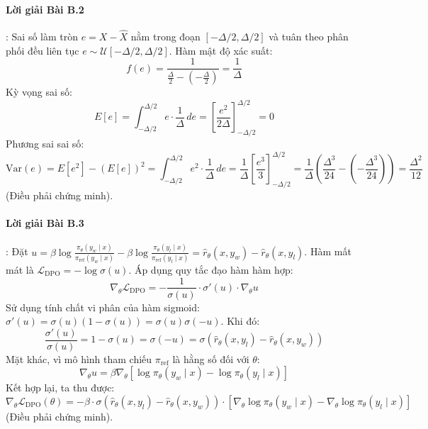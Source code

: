\paragraph{Lời giải Bài B.2}:
Sai số làm tròn $e = X - \hat{X}$ nằm trong đoạn $[-\Delta / 2, \Delta / 2]$ và tuân theo phân phối đều liên tục $e \sim \mathcal{U}[-\Delta/2, \Delta/2]$. Hàm mật độ xác suất:
\begin{equation*}
f(e) = \frac{1}{\frac{\Delta}{2} - \left(-\frac{\Delta}{2}\right)} = \frac{1}{\Delta}
\end{equation*}
Kỳ vọng sai số:
\begin{equation*}
E[e] = \int_{-\Delta/2}^{\Delta/2} e \cdot \frac{1}{\Delta} \, de = \left[ \frac{e^2}{2\Delta} \right]_{-\Delta/2}^{\Delta/2} = 0
\end{equation*}
Phương sai sai số:
\begin{equation*}
\text{Var}(e) = E[e^2] - (E[e])^2 = \int_{-\Delta/2}^{\Delta/2} e^2 \cdot \frac{1}{\Delta} \, de = \frac{1}{\Delta} \left[ \frac{e^3}{3} \right]_{-\Delta/2}^{\Delta/2} = \frac{1}{\Delta} \left( \frac{\Delta^3}{24} - \left(-\frac{\Delta^3}{24}\right) \right) = \frac{\Delta^2}{12}
\end{equation*}
(Điều phải chứng minh).

\paragraph{Lời giải Bài B.3}:
Đặt $u = \beta \log \frac{\pi_\theta(y_w \mid x)}{\pi_{\text{ref}}(y_w \mid x)} - \beta \log \frac{\pi_\theta(y_l \mid x)}{\pi_{\text{ref}}(y_l \mid x)} = \hat{r}_\theta(x, y_w) - \hat{r}_\theta(x, y_l)$.
Hàm mất mát là $\mathcal{L}_{\text{DPO}} = -\log \sigma(u)$. Áp dụng quy tắc đạo hàm hàm hợp:
\begin{equation*}
\nabla_\theta \mathcal{L}_{\text{DPO}} = -\frac{1}{\sigma(u)} \cdot \sigma'(u) \cdot \nabla_\theta u
\end{equation*}
Sử dụng tính chất vi phân của hàm sigmoid: $\sigma'(u) = \sigma(u)(1 - \sigma(u)) = \sigma(u)\sigma(-u)$. Khi đó:
\begin{equation*}
\frac{\sigma'(u)}{\sigma(u)} = 1 - \sigma(u) = \sigma(-u) = \sigma\left(\hat{r}_\theta(x, y_l) - \hat{r}_\theta(x, y_w)\right)
\end{equation*}
Mặt khác, vì mô hình tham chiếu $\pi_{\text{ref}}$ là hằng số đối với $\theta$:
\begin{equation*}
\nabla_\theta u = \beta \nabla_\theta \left[\log \pi_\theta(y_w \mid x) - \log \pi_\theta(y_l \mid x)\right]
\end{equation*}
Kết hợp lại, ta thu được:
\begin{equation*}
\nabla_\theta \mathcal{L}_{\text{DPO}}(\theta) = -\beta \cdot \sigma\left( \hat{r}_\theta(x, y_l) - \hat{r}_\theta(x, y_w) \right) \cdot \left[ \nabla_\theta \log \pi_\theta(y_w \mid x) - \nabla_\theta \log \pi_\theta(y_l \mid x) \right]
\end{equation*}
(Điều phải chứng minh).

